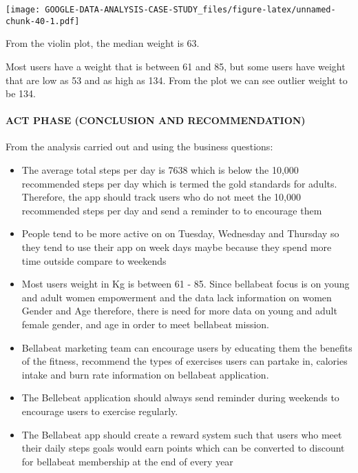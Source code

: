 \documentclass[
]{article}
\begin{document}
\texttt{[image: GOOGLE-DATA-ANALYSIS-CASE-STUDY\_files/figure-latex/unnamed-chunk-40-1.pdf]}

From the violin plot, the median weight is 63.

Most users have a weight that is between 61 and 85, but some users have
weight that are low as 53 and as high as 134. From the plot we can see
outlier weight to be 134.

\hypertarget{act-phase-conclusion-and-recommendation}{%
\paragraph{\texorpdfstring{\textbf{ACT PHASE (CONCLUSION AND
RECOMMENDATION)}}{ACT PHASE (CONCLUSION AND RECOMMENDATION)}}\label{act-phase-conclusion-and-recommendation}}

From the analysis carried out and using the business questions:

\begin{itemize}
\item
  The average total steps per day is 7638 which is below the 10,000
  recommended steps per day which is termed the gold standards for
  adults. Therefore, the app should track users who do not meet the
  10,000 recommended steps per day and send a reminder to to encourage
  them
\item
  People tend to be more active on on Tuesday, Wednesday and Thursday so
  they tend to use their app on week days maybe because they spend more
  time outside compare to weekends
\item
  Most users weight in Kg is between 61 - 85. Since bellabeat focus is
  on young and adult women empowerment and the data lack information on
  women Gender and Age therefore, there is need for more data on young
  and adult female gender, and age in order to meet bellabeat mission.
\item
  Bellabeat marketing team can encourage users by educating them the
  benefits of the fitness, recommend the types of exercises users can
  partake in, calories intake and burn rate information on bellabeat
  application.
\item
  The Bellebeat application should always send reminder during weekends
  to encourage users to exercise regularly.
\item
  The Bellabeat app should create a reward system such that users who
  meet their daily steps goals would earn points which can be converted
  to discount for bellabeat membership at the end of every year
\end{itemize}
\end{document}
